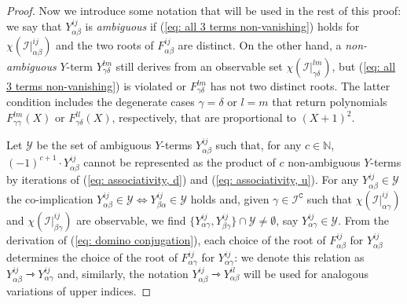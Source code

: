 \documentclass[10pt]{article}
\theoremstyle{remark}%
\theoremstyle{definition}%
\begin{document}
\begin{proof}
Now we introduce some notation that will be used in the rest of this proof: we say that $Y_{\alpha\beta}^{ij}$ is \emph{ambiguous} if (\ref{eq: all 3 terms non-vanishing}) holds for $\chi(\mathcal{I}|_{\alpha\beta}^{ij})$ and the two roots of $F_{\alpha\beta}^{ij}$ are distinct. On the other hand, a \emph{non-ambiguous} $Y$-term $Y_{\gamma\delta}^{lm}$ still derives from an observable set $\chi(\mathcal{I}|_{\gamma\delta}^{lm})$, but (\ref{eq: all 3 terms non-vanishing}) is violated or $F_{\gamma\delta}^{lm}$ has not two distinct roots. The latter condition includes the degenerate cases $\gamma=\delta$ or $l=m$ that return polynomials $F_{\gamma\gamma}^{lm}(X)$ or $F_{\gamma\delta}^{ll}(X)$, respectively, that are proportional to $(X+1)^{2}$. 

Let $\mathcal{Y}$ be the set of ambiguous $Y$-terms $Y_{\alpha\beta}^{ij}$ such that, for any $c\in\mathbb{N}$, $(-1)^{c+1}\cdot Y_{\alpha\beta}^{ij}$ cannot be represented as the product of $c$ non-ambiguous $Y$-terms by iterations of (\ref{eq: associativity, d}) and (\ref{eq: associativity, u}). 
For any $Y_{\alpha\beta}^{ij}\in\mathcal{Y}$ the co-implication $Y_{\alpha\beta}^{ij}\in\mathcal{Y}\Leftrightarrow Y_{\beta\alpha}^{ij}\in\mathcal{Y}$ holds and, given  $\gamma\in\mathcal{I}^{\mathtt{C}}$ such that $\chi(\mathcal{I}|_{\alpha\gamma}^{ij})$ and $\chi(\mathcal{I}|_{\beta\gamma}^{ij})$ are observable, we find $\{ Y_{\alpha\gamma}^{ij},Y_{\beta\gamma}^{ij} \}\cap\mathcal{Y}\neq\emptyset$, say $Y_{\alpha\gamma}^{ij}\in\mathcal{Y}$. From the derivation of (\ref{eq: domino conjugation}), each choice of the root of $F_{\alpha\beta}^{ij}$ for $Y_{\alpha\beta}^{ij}$ determines the choice of the root of $F_{\alpha\gamma}^{ij}$ for $Y_{\alpha\gamma}^{ij}$: we denote this relation as $Y_{\alpha\beta}^{ij}\rightarrowtriangle Y_{\alpha\gamma}^{ij}$ and, similarly, the notation $Y_{\alpha\beta}^{ij}\rightarrowtriangle Y_{\alpha\beta}^{il}$ will be used for analogous variations of upper indices. 


\end{proof}
\end{document}

